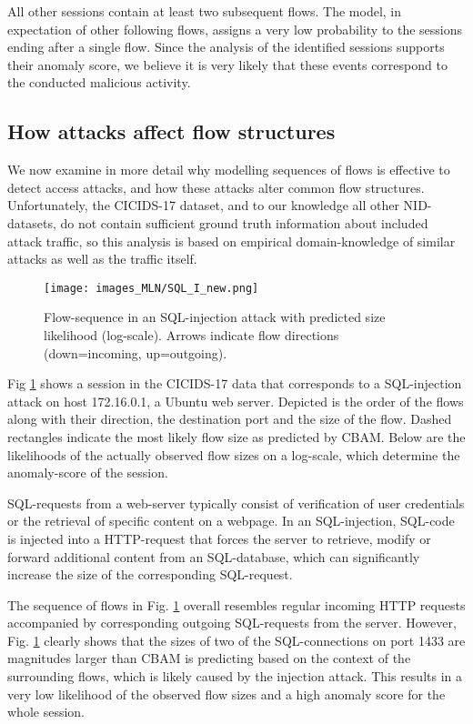 All other sessions contain at least two subsequent flows. The model, in expectation of other following flows, assigns a very low probability to the sessions ending after a single flow. Since the analysis of the identified sessions supports their anomaly score, we believe it is very likely that these events correspond to the conducted malicious activity. 


\subsection{How attacks affect flow structures}\label{SecF:AttackInfl}

We now examine in more detail why modelling sequences of flows is effective to detect access attacks, and how these attacks alter common flow structures. Unfortunately, the CICIDS-17 dataset, and to our knowledge all other NID-datasets, do not contain sufficient ground truth information about included attack traffic, so this analysis is based on empirical domain-knowledge of similar attacks as well as the traffic itself.

\begin{figure}[ht]
    \begin{center}
      \texttt{[image: images\_MLN/SQL\_I\_new.png]}
    \end{center}
    \caption{Flow-sequence in an SQL-injection attack with predicted size likelihood (log-scale). Arrows indicate flow directions (down=incoming, up=outgoing).}\label{figF:SQL_I}
\end{figure}


Fig \ref{figF:SQL_I} shows a session in the CICIDS-17 data that corresponds to a SQL-injection attack on host 172.16.0.1, a Ubuntu web server. Depicted is the order of the flows along with their direction, the destination port and the size of the flow. Dashed rectangles indicate the most likely flow size as predicted by CBAM. Below are the likelihoods of the actually observed flow sizes on a log-scale, which determine the anomaly-score of the session.

SQL-requests from a web-server typically consist of verification of user credentials or the retrieval of specific content on a webpage.
In an SQL-injection, SQL-code is injected into a HTTP-request that forces the server to retrieve, modify or forward additional content from an SQL-database, which can significantly increase the size of the corresponding SQL-request. 

The sequence of flows in Fig. \ref{figF:SQL_I} overall resembles regular incoming HTTP requests accompanied by corresponding outgoing SQL-requests from the server. However, 
Fig. \ref{figF:SQL_I} clearly shows that the sizes of two of the SQL-connections on port 1433 are magnitudes larger than CBAM is predicting based on the context of the surrounding flows, which is likely caused by the injection attack. This results in a very low likelihood of the observed flow sizes and a high anomaly score for the whole session.



